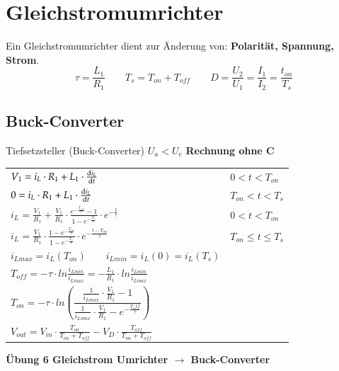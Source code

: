 \section{Gleichstromumrichter}
Ein Gleichstromumrichter dient zur Änderung von: \textbf{Polarität, Spannung, Strom}.\newline
\vspace{-0.2cm}
\[ \tau=\frac{L_1}{R_1} \qquad T_s=T_{on} + T_{off} \qquad  D = \frac{U_2}{U_1}=\frac{I_1}{I_2}=\frac{t_{on}}{T_s} \]
\vspace{-1cm}
\subsection{Buck-Converter}
\begin{minipage}{0.75\linewidth}
    Tiefsetzsteller (Buck-Converter) $U_a < U_e  $\newline
    \textbf{Rechnung ohne C}\newline
    \renewcommand{\arraystretch}{2}
    \begin{tabular}{p{9cm} p{3cm}}
        $ V_1 = i_L\cdot R_1+L_1\cdot\frac{\mathop{}\!\mathrm{d} i_L}{\mathop{}\!\mathrm{d} t} $ &
        $ 0<t<T_{on} $
        \\  
        $ 0 = i_L\cdot R_1+L_1\cdot\frac{\mathop{}\!\mathrm{d} i_L}{\mathop{}\!\mathrm{d} t}$ & $T_{on}<t<T_{s} $
        \\  
        $ i_L=\frac{V_1}{R_1}+ \frac{V_1}{R_1}\cdot \frac{e^{-\frac{T_{off}}{\tau}}-1}{1-e^{-\frac{T_{s}}{\tau}}}\cdot e^{-\frac{t}{\tau}}$ &
        $ 0<t<T_{on}  $
        \\  
        $ i_L=\frac{V_1}{R_1}\cdot \frac{1-e^{-\frac{T_{on}}{\tau}}}{1-e^{-\frac{T_{s}}{\tau}}}\cdot e^{-\frac{t-T_{on}}{\tau}}$ &
        $ T_{on}\leq t \leq T_{s}  $
        \\ 
        $ i_{Lmax} = i_L(T_{on}) \qquad i_{Lmin} = i_L(0) = i_L(T_s) $    
        & \\ 
        $ T_{off}=-\tau \cdot ln\frac{i_{Lmin}}{i_{Lmax}}= -\frac{L_1}{R_1}\cdot ln\frac{i_{Lmin}}{i_{Lmax}} $
        & \\    
        $ T_{on}=-\tau \cdot ln\left(\dfrac{\frac{1}{i_{Lmax}}\cdot\frac{V_1}{R_1}-1}{\frac{1}{i_{Lmax}}\cdot \frac{V_1}{R_1}-e^{-\frac{T_off}{\tau}}}\right) $
        & \\ 
        $ V_{out}=V_{in}\cdot \frac{T_{on}}{T_{on}+T_{off}}-V_D\cdot\frac{T_{off}}{T_{on}+T_{off}} $
        & \\ 
    \end{tabular}
\newline
\textbf{Übung 6 Gleichstrom Umrichter $ \rightarrow $ Buck-Converter}
\renewcommand{\arraystretch}{1}
\end{minipage}

